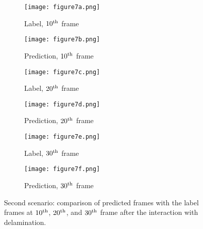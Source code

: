 \begin{figure} []
	\centering
	\begin{subfigure}[b]{0.44\textwidth}
		\centering
		\texttt{[image: figure7a.png]}
		\caption{Label, $10\textsuperscript{th}$ frame}
		\label{fig:num_453_label1}
	\end{subfigure}
	\hfill
	\begin{subfigure}[b]{0.44\textwidth}
		\centering
		\texttt{[image: figure7b.png]} 
		\caption{Prediction, $10\textsuperscript{th}$ frame}
		\label{fig:num_453_pred1}
	\end{subfigure}
	\hfill
	\begin{subfigure}[b]{0.44\textwidth}
		\centering
		\texttt{[image: figure7c.png]}
		\caption{Label, $20\textsuperscript{th}$ frame}
		\label{fig:num_453_label2}
	\end{subfigure}
	\hfill
	\begin{subfigure}[b]{0.44\textwidth}
		\centering
		\texttt{[image: figure7d.png]}
		\caption{Prediction, $20\textsuperscript{th}$ frame}
		\label{fig:num_453_pred2}
	\end{subfigure}
	\hfill
	\begin{subfigure}[b]{0.44\textwidth}
		\centering
		\texttt{[image: figure7e.png]}
		\caption{Label, $30\textsuperscript{th}$ frame}
		\label{fig:num_453_label3}
	\end{subfigure}
	\hfill	
	\begin{subfigure}[b]{0.44\textwidth}
		\centering
		\texttt{[image: figure7f.png]}
		\caption{Prediction, $30\textsuperscript{th}$ frame}
		\label{fig:num_453_pred3}
	\end{subfigure}
	\hfill	
	\caption{Second scenario: comparison of predicted frames with the label 
		frames at $10\textsuperscript{th}$, $20\textsuperscript{th}$, and 
		$30\textsuperscript{th}$ frame after the interaction with delamination.}
	\label{fig:num_453}
\end{figure}
